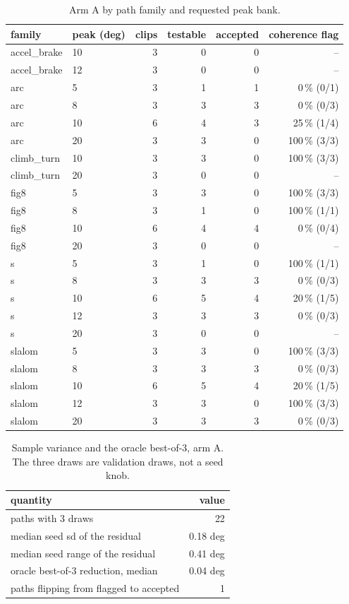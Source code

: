 \begin{table}[t]
\footnotesize
\begin{tabular}{llrrrr}
\toprule
family & peak (deg) & clips & testable & accepted & coherence flag \\
\midrule
accel_brake & 10 & 3 & 0 & 0 & -- \\
accel_brake & 12 & 3 & 0 & 0 & -- \\
arc & 5 & 3 & 1 & 1 & 0\,\% (0/1) \\
arc & 8 & 3 & 3 & 3 & 0\,\% (0/3) \\
arc & 10 & 6 & 4 & 3 & 25\,\% (1/4) \\
arc & 20 & 3 & 3 & 0 & 100\,\% (3/3) \\
climb_turn & 10 & 3 & 3 & 0 & 100\,\% (3/3) \\
climb_turn & 20 & 3 & 0 & 0 & -- \\
fig8 & 5 & 3 & 3 & 0 & 100\,\% (3/3) \\
fig8 & 8 & 3 & 1 & 0 & 100\,\% (1/1) \\
fig8 & 10 & 6 & 4 & 4 & 0\,\% (0/4) \\
fig8 & 20 & 3 & 0 & 0 & -- \\
s & 5 & 3 & 1 & 0 & 100\,\% (1/1) \\
s & 8 & 3 & 3 & 3 & 0\,\% (0/3) \\
s & 10 & 6 & 5 & 4 & 20\,\% (1/5) \\
s & 12 & 3 & 3 & 3 & 0\,\% (0/3) \\
s & 20 & 3 & 0 & 0 & -- \\
slalom & 5 & 3 & 3 & 0 & 100\,\% (3/3) \\
slalom & 8 & 3 & 3 & 3 & 0\,\% (0/3) \\
slalom & 10 & 6 & 5 & 4 & 20\,\% (1/5) \\
slalom & 12 & 3 & 3 & 0 & 100\,\% (3/3) \\
slalom & 20 & 3 & 3 & 3 & 0\,\% (0/3) \\
\bottomrule
\end{tabular}
\caption{Arm A by path family and requested peak bank.}
\label{tab:h04-grid}
\end{table}

\begin{table}[t]
\footnotesize
\begin{tabular}{lr}
\toprule
quantity & value \\
\midrule
paths with 3 draws & 22 \\
median seed sd of the residual & 0.18 deg \\
median seed range of the residual & 0.41 deg \\
oracle best-of-3 reduction, median & 0.04 deg \\
paths flipping from flagged to accepted & 1 \\
\bottomrule
\end{tabular}
\caption{Sample variance and the oracle best-of-3, arm A.  The three draws are validation draws, not a seed knob.}
\label{tab:h04-sampling}
\end{table}



